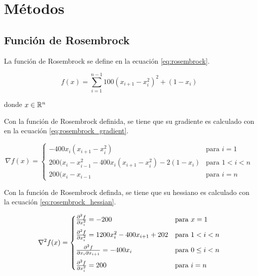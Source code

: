 \section{Métodos}

\subsection{Función de Rosembrock}

La función de Rosembrock se define en la ecuación \ref{eq:rosembrock}.

\begin{equation}
    f(x) = \sum_{i=1}^{n-1}  100(x_{i+1}-x_{i}^2)^2 +(1-x_i)
    \label{eq:rosembrock}
\end{equation}

donde $x\in \mathbb{R}^n$

Con la función de Rosembrock definida, se tiene que su gradiente es calculado con en la ecuación \ref{eq:rosembrock_gradient}.

\begin{equation}
    \nabla f (x) =\begin{cases}
        -400x_i(x_{i+1}-x_{i}^2)                              & \text{para } i=1   \\[0.25cm]
        200(x_{i}-x_{i-1}^2-400x_i(x_{i+1}-x_{i}^2) -2(1-x_i) & \text{para } 1<i<n \\[0.25cm]
        200(x_{i}-x_{i-1}                                     & \text{para } i=n
    \end{cases} \label{eq:rosembrock_gradient}
\end{equation}

Con la función de Rosembrock definda, se tiene que su hessiano es calculado con la ecuación \ref{eq:rosembrock_hessian}.

\begin{equation}
    \nabla^2 f(x)  = \begin{cases}
        \frac{\partial^2 f}{\partial x_i^2} = -200                    & \text{para } x=1         \\[0.25cm]
        \frac{\partial^2 f}{\partial x_i^2} =1200x_i^2-400x_{i+1}+202 & \text{para } 1<i<n       \\[0.25cm]
        \frac{\partial^2 f}{\partial x_i \partial x_{i+1}}  = -400x_i       & \text{para } 0\leq i < n \\[0.25cm]
        \frac{\partial^2 f}{\partial x_i^2} = 200                     & \text{para } i=n
    \end{cases}
    \label{eq:rosembrock_hessian}
\end{equation}

